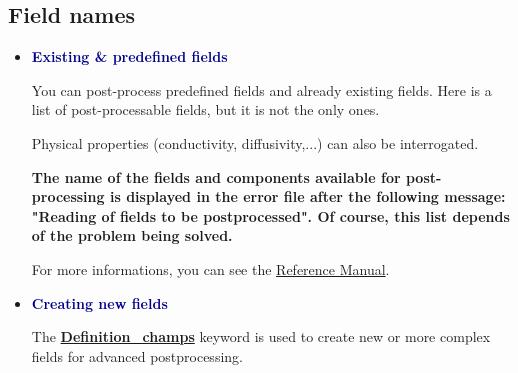 \subsection{Field names}
\begin{itemize}
\item \textcolor{darkblue}{\textbf{Existing \& predefined fields}}

You can post-process predefined fields and already existing fields.
Here is a list of post-processable fields, but it is not the only ones.

\small

\normalsize

\begin{remark}
Physical properties (conductivity, diffusivity,...) can also be interrogated.
\end{remark}


\textbf{The name of the fields and components available for post-processing is displayed in the error file after the following message: "Reading of fields to be postprocessed". Of course, this list depends of the problem being solved.}

For more informations, you can see the \href{\REFERENCEMANUAL\#champsapost}{\trustref Reference Manual}.

\item \textcolor{darkblue}{\textbf{Creating new fields}}

The \href{\REFERENCEMANUAL\#definitionchamps}{\textbf{Definition\_champs}} keyword is used to create new or more complex fields for advanced postprocessing.

\begin{center}
\end{center}





\end{itemize}
